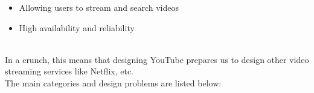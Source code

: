 \begin{itemize}
\item
\protect{}\label{Ull3GwmJxqiR3li_OX_D2}
Allowing users to stream and search videos
\item
\protect{}\label{dc-iGnhIhP0GiCQoLWhx8}
High availability and reliability
\end{itemize}
\\
In a crunch, this means that designing YouTube prepares us to design other video streaming services like Netflix, etc.
\\
The main categories and design problems are listed below:

\begin{center}
\end{center}

